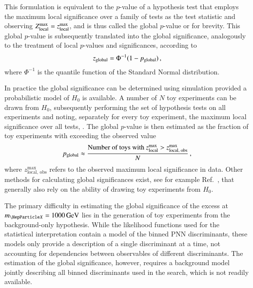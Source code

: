 This formulation %
is equivalent to the $p$-value of a hypothesis test that employs the
maximum local significance over a family of tests as the test
statistic and observing $Z_{\text{local}}^{\text{max}} = z_{\text{local}}^{\text{max}}$, and is thus called
the global $p$-value or \pglobal for brevity. This global $p$-value is
subsequently translated into the global significance, analogously to
the treatment of local $p$-values and significances, according to
\begin{align*}
  z_{\text{global}} = \Phi^{-1}(1 - p_{\text{global}}) \,\text{,}
\end{align*}
where $\Phi^{-1}$ is the quantile function of the Standard Normal
distribution.

In practice the global significance can be determined using simulation
provided a probabilistic model of $H_0$ is available. A number of $N$
toy experiments can be drawn from $H_0$, subsequently performing the
set of hypothesis tests on all experiments and noting, separately for
every toy experiment, the maximum local significance over all tests,
\zmaxlocal. The global $p$-value is then estimated as the fraction of
toy experiments with \zmaxlocal exceeding the observed value
\begin{align*}
  p_{\text{global}} \approx \frac{ \text{Number of toys with } z_{\text{local}}^{\text{max}} > z_{\text{local, obs}}^{\text{max}} }
                        { N } \,\text{,}
\end{align*}
where $z_{\text{local, obs}}^{\text{max}}$ refers to the observed
maximum local significance in data. Other methods for calculating
global significances exist, see for example Ref.~\cite{Gross:2010qma},
that generally also rely on the ability of drawing toy experiments
from $H_0$.

The primary difficulty in estimating the global significance of the
excess at $\mX = \SI{1000}{\GeV}$ lies in the generation of toy
experiments from the background-only hypothesis. While the likelihood
functions used for the statistical interpretation contain a model of
the binned PNN discriminants, these models only provide a description
of a single discriminant at a time, not accounting for dependencies
between observables of different discriminants. The estimation of the
global significance, however, requires a background model jointly
describing all binned discriminants used in the search, which is not
readily available.

